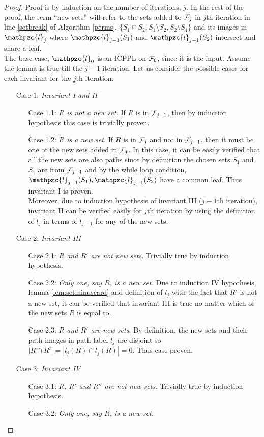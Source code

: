 \documentclass{llncs}
\def\cF{{\cal F}}
\def\cl{\mathpzc{l}}
\begin{document}
\begin{proof}
  Proof is by induction on the number of iterations, $j$. In the rest
  of the proof, the term ``new sets'' will refer to the sets added
  to $\cF_j$ in $j$th iteration in line \ref{setbreak} of Algorithm
  \ref{perms}, $\{S_1 \cap S_2, S_1 \setminus S_2, S_2 \setminus S_1
  \}$ and its images in $\cl_j$ where $\cl_{j-1}(S_1)$ and
  $\cl_{j-1}(S_2)$
  intersect and share a leaf.\\
  \noindent
  The base case, $\cl_0$ is an ICPPL on $\cF_0$, since it is the
  input.  Assume the lemma is true till the $j-1$ iteration. Let us consider
the possible cases for each invariant for the  $j$th  iteration.

  \noindent
  \begin{enumerate}
  \item [Case 1:] {\em Invariant I and II} 
    \begin{enumerate}
    \item [Case 1.1:] {\em $R$ is not a new set.} If $R$ is in
      $\cF_{j-1}$, then by induction hypothesis this case is trivially
      proven.
    \item [Case 1.2:] {\em $R$ is a new set.} If $R$ is in $\cF_{j}$
      and not in $\cF_{j-1}$, then it must be one of the new sets
      added in $\cF_j$. In this case, it can be easily verified that
      all the new sets are also paths since by definition the chosen
      sets $S_1$ and $S_1$ are from $\cF_{j-1}$ and by the while loop
      condition, $\cl_{j-1}(S_1), \cl_{j-1}(S_2)$ have a common
      leaf. Thus invariant I is proven.\\
      Moreover, due to induction hypothesis of invariant III ($j-1$th
      iteration), invariant II can be verified easily for $j$th
      iteration by using the definition of $l_j$ in terms of $l_{j-1}$
      for any of the new sets.
   \end{enumerate}
  \item [Case 2:] {\em Invariant III}
    \begin{enumerate}
    \item [Case 2.1:] {\em $R$ and $R'$ are not new sets.} Trivially
      true by induction hypothesis.
    \item [Case 2.2:] {\em Only one, say $R$, is a new set.} Due to
      induction IV hypothesis, lemma \ref{lem:setminuscard} and
      definition of $l_j$ with the fact that $R'$ is not a new set, it
      can be verified that invariant III is true no matter which of
      the new sets $R$ is equal to.
    \item [Case 2.3:] {\em $R$ and $R'$ are new sets.} By definition,
      the new sets and their path images in path label $l_j$ are
      disjoint so $|R \cap R'| = |l_j(R) \cap l_j(R)| = 0$. Thus case
      proven.
    \end{enumerate}
  \item [Case 3:] {\em Invariant IV}
    \begin{enumerate}
    \item [Case 3.1:] {\em $R$, $R'$ and $R''$ are not new sets.} Trivially
      true by induction hypothesis.
    \item [Case 3.2:] {\em Only one, say $R$, is a new set.}


\end{enumerate}
\end{enumerate}
\end{proof}
\end{document}
